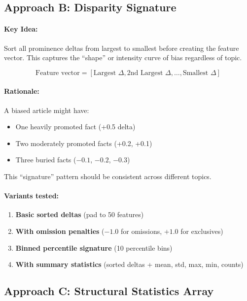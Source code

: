 \documentclass[12pt,a4paper]{article}
\begin{document}
\subsection{Approach B: Disparity Signature}

\paragraph{Key Idea:} Sort all prominence deltas from largest to smallest before creating the
feature vector. This captures the ``shape'' or intensity curve of bias regardless of topic.

\[
\text{Feature vector} = [\text{Largest } \Delta, \text{2nd Largest } \Delta, \ldots, \text{Smallest } \Delta]
\]

\paragraph{Rationale:} A biased article might have:
\begin{itemize}
\item One heavily promoted fact (+0.5 delta)
\item Two moderately promoted facts (+0.2, +0.1)
\item Three buried facts ($-0.1$, $-0.2$, $-0.3$)
\end{itemize}

This ``signature'' pattern should be consistent across different topics.

\paragraph{Variants tested:}
\begin{enumerate}
\item \textbf{Basic sorted deltas} (pad to 50 features)
\item \textbf{With omission penalties} ($-1.0$ for omissions, $+1.0$ for exclusives)
\item \textbf{Binned percentile signature} (10 percentile bins)
\item \textbf{With summary statistics} (sorted deltas + mean, std, max, min, counts)
\end{enumerate}

\subsection{Approach C: Structural Statistics Array}
\end{document}

